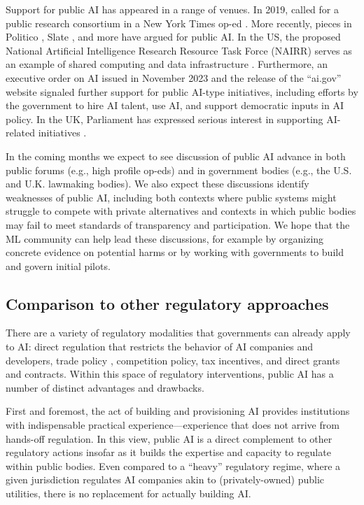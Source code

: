 \documentclass{article}
\begin{document}
Support for public AI has appeared in a range of venues. In 2019, \citeauthor{ganskyOpinionArtificialIntelligence2019} called for a public research consortium in a New York Times op-ed \cite{ganskyOpinionArtificialIntelligence2019}. More recently, pieces in Politico \cite{jenningsOpinionThereOnly2023}, Slate \cite{schneierHowArtificialIntelligence2023}, and more \cite{sandersBuildAIPeople2023} have argued for public AI. In the US, the proposed National Artificial Intelligence Research Resource Task Force (NAIRR) serves as an example of shared computing and data infrastructure \cite{lynchNewReportDetails2023}. Furthermore, an executive order on AI issued in November 2023 and the release of the ``ai.gov'' website signaled further support for public AI-type initiatives, including efforts by the government to hire AI talent, use AI, and support democratic inputs in AI policy. In the UK, Parliament has expressed serious interest in supporting AI-related initiatives \cite{ukparliamentGovernanceArtificialIntelligence2023}.

In the coming months we expect to see discussion of public AI advance in both public forums (e.g., high profile op-eds) and in government bodies (e.g., the U.S. and U.K. lawmaking bodies). We also expect these discussions identify weaknesses of public AI, including both contexts where public systems might struggle to compete with private alternatives and contexts in which public bodies may fail to meet standards of transparency and participation. We hope that the ML community can help lead these discussions, for example by organizing concrete evidence on potential harms or by working with governments to build and govern initial pilots.

\subsection{Comparison to other regulatory approaches}
There are a variety of regulatory modalities that governments can already apply to AI: direct regulation that restricts the behavior of AI companies and developers, trade policy \cite{irion_ai_2021, tan_how_2023}, competition policy, tax incentives, and direct grants and contracts.
Within this space of regulatory interventions, public AI has a number of distinct advantages and drawbacks.

First and foremost, the act of building and provisioning AI provides institutions with indispensable practical experience---experience that does not arrive from hands-off regulation. In this view, public AI is a direct complement to other regulatory actions insofar as it builds the expertise and capacity to regulate within public bodies. Even compared to a ``heavy'' regulatory regime, where a given jurisdiction regulates AI companies akin to (privately-owned) public utilities, there is no replacement for actually building AI.
\end{document}

